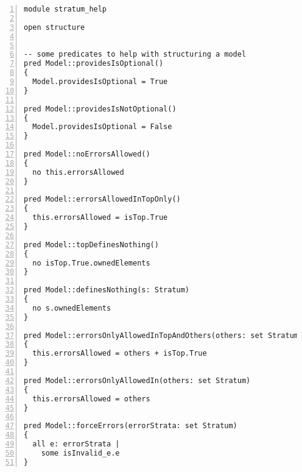 \lstset{frame=tb, aboveskip=12pt, belowskip=-3pt, breaklines=true, basicstyle=\tiny\ttfamily, tabsize=2, mathescape=true}
\begin{lstlisting}[caption={stratum\_help.als}, numbers=left]
module stratum_help

open structure


-- some predicates to help with structuring a model
pred Model::providesIsOptional()
{
  Model.providesIsOptional = True
}

pred Model::providesIsNotOptional()
{
  Model.providesIsOptional = False
}

pred Model::noErrorsAllowed()
{
  no this.errorsAllowed
}

pred Model::errorsAllowedInTopOnly()
{
  this.errorsAllowed = isTop.True
}

pred Model::topDefinesNothing()
{
  no isTop.True.ownedElements
}

pred Model::definesNothing(s: Stratum)
{
  no s.ownedElements
}

pred Model::errorsOnlyAllowedInTopAndOthers(others: set Stratum)
{
  this.errorsAllowed = others + isTop.True
}

pred Model::errorsOnlyAllowedIn(others: set Stratum)
{
  this.errorsAllowed = others
}

pred Model::forceErrors(errorStrata: set Stratum)
{
  all e: errorStrata |
    some isInvalid_e.e
}
\end{lstlisting}